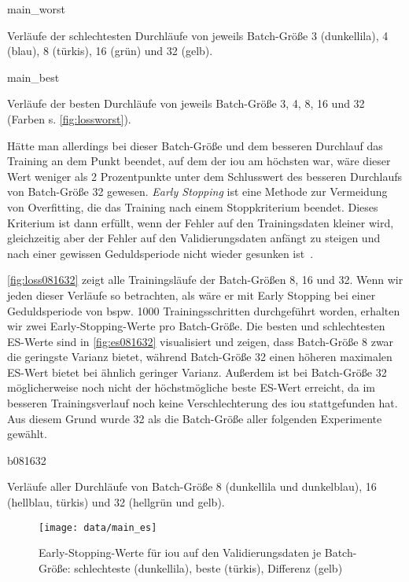 \begin{losses}{main_worst}
	\caption{Verläufe der schlechtesten Durchläufe von jeweils Batch-Größe 3 (dunkellila), 4 (blau), 8 (türkis), 16 (grün) und 32 (gelb).}
	\label{fig:lossworst}
\end{losses}

\begin{losses}{main_best}
	\caption{Verläufe der besten Durchläufe von jeweils Batch-Größe 3, 4, 8, 16 und 32 (Farben s. \autoref{fig:lossworst}).}
	\label{fig:lossbest}
\end{losses}

Hätte man allerdings bei dieser Batch-Größe und dem besseren Durchlauf das Training an dem Punkt beendet, auf dem der \gls{iou} am höchsten war, wäre dieser Wert weniger als 2 Prozentpunkte unter dem Schlusswert des besseren Durchlaufs von Batch-Größe 32 gewesen.
\emph{Early Stopping} ist eine Methode zur Vermeidung von Overfitting, die das Training nach einem Stoppkriterium beendet.
Dieses Kriterium ist dann erfüllt, wenn der Fehler auf den Trainingsdaten kleiner wird, gleichzeitig aber der Fehler auf den Validierungsdaten anfängt zu steigen und nach einer gewissen Geduldsperiode nicht wieder gesunken ist~\cite{Goodfellow.2016}.

\autoref{fig:loss081632} zeigt alle Trainingsläufe der Batch-Größen 8, 16 und 32.
Wenn wir jeden dieser Verläufe so betrachten, als wäre er mit Early Stopping bei einer Geduldsperiode von bspw. 1000 Trainingsschritten durchgeführt worden, erhalten wir zwei Early-Stopping-Werte pro Batch-Größe.
Die besten und schlechtesten ES-Werte sind in \autoref{fig:es081632} visualisiert und zeigen, dass Batch-Größe 8 zwar die geringste Varianz bietet, während Batch-Größe 32 einen höheren maximalen ES-Wert bietet bei ähnlich geringer Varianz.
Außerdem ist bei Batch-Größe 32 möglicherweise noch nicht der höchstmögliche beste ES-Wert erreicht, da im besseren Trainingsverlauf noch keine Verschlechterung des \gls{iou} stattgefunden hat.
Aus diesem Grund wurde 32 als die Batch-Größe aller folgenden Experimente gewählt.

\begin{losses}{b081632}
	\caption{Verläufe aller Durchläufe von Batch-Größe 8 (dunkellila und dunkelblau), 16 (hellblau, türkis) und 32 (hellgrün und gelb).}
	\label{fig:loss081632}
\end{losses}

\begin{figure}
	\centering
	\texttt{[image: data/main\_es]}
	\caption{Early-Stopping-Werte für \gls{iou} auf den Validierungsdaten je Batch-Größe: schlechteste (dunkellila), beste (türkis), Differenz (gelb)}
	\label{fig:es081632}
\end{figure}



